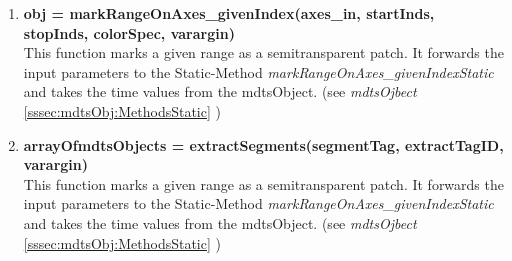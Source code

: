 \documentclass[a4]{scrreprt}
\begin{document}
\begin{enumerate}
\item \textbf{obj = markRangeOnAxes\_givenIndex(axes\_in, startInds, stopInds, colorSpec, varargin)}\\
This function marks a given range as a semitransparent patch. It forwards the input parameters to the Static-Method \textit{markRangeOnAxes\_givenIndexStatic} and takes the time values from the mdtsObject.
(see \textit{mdtsOjbect} \ref{sssec:mdtsObj:MethodsStatic} )

\item \textbf{arrayOfmdtsObjects = extractSegments(segmentTag, extractTagID, varargin)}\\
This function marks a given range as a semitransparent patch. It forwards the input parameters to the Static-Method \textit{markRangeOnAxes\_givenIndexStatic} and takes the time values from the mdtsObject.
(see \textit{mdtsOjbect} \ref{sssec:mdtsObj:MethodsStatic} )

\end{enumerate}
\end{document}

